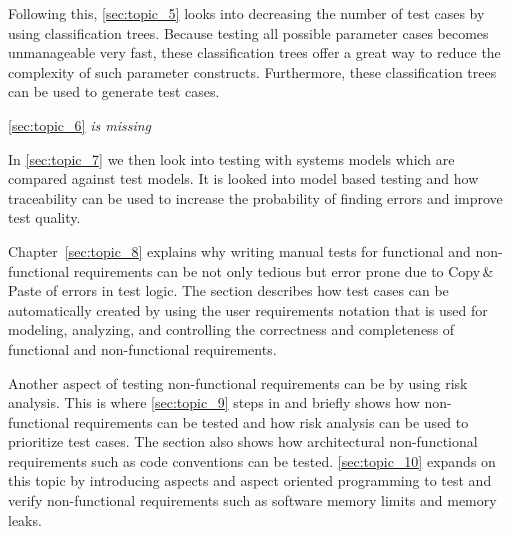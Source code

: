 

Following this,
\autoref{sec:topic_5} %
looks into decreasing the number of test cases by using classification trees.
Because testing all possible parameter cases becomes unmanageable very fast, these classification trees offer a great way to reduce the complexity of such parameter constructs.
Furthermore, these classification trees can be used to generate test cases.


\autoref{sec:topic_6} %
\textit{is missing}

In \autoref{sec:topic_7} %
we then look into testing with systems models which are compared against test models.
It is looked into model based testing and how traceability can be used to increase the probability of finding errors and improve test quality.

Chapter~\ref{sec:topic_8} %
explains why writing manual tests for functional and non-functional requirements can be  not only tedious but error prone due to Copy\,\&\,Paste of errors in test logic.
The section describes how test cases can be automatically created by using the user requirements notation that is used for modeling, analyzing, and controlling the correctness and completeness of functional and non-functional requirements.

Another aspect of testing non-functional requirements can be by using risk analysis.
This is where \autoref{sec:topic_9} %
steps in and briefly shows how non-functional requirements can be tested and how risk analysis can be used to prioritize test cases.
The section also shows how architectural non-functional requirements such as code conventions can be tested.
\autoref{sec:topic_10} %
expands on this topic by introducing aspects and aspect oriented programming to test and verify non-functional requirements such as software memory limits and memory leaks.

